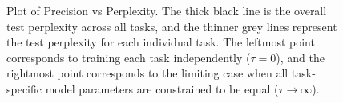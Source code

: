 \documentclass[fullpaper]{nldl}
\begin{document}
\begin{figure}[ht]
    \caption{Plot of Precision vs Perplexity. The thick black line is the overall test perplexity across all tasks, and the thinner grey lines represent the test perplexity for each individual task. The leftmost point corresponds to training each task independently ($\tau = 0$), and the rightmost point corresponds to the limiting case when all task-specific model parameters are constrained to be equal ($\tau \rightarrow \infty$).}
    \label{fig:results_plot}
\end{figure}
\end{document}
